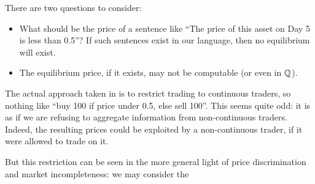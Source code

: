 \begin{definition}\label{def:exploitation}
    
\end{definition}






There are two questions to consider:

\begin{itemize}
    \item What should be the price of a sentence like ``The price of this asset on Day 5 is less than 0.5''? If such sentences exist in our language, then no equilibrium will exist.
    \item The equilibrium price, if it exists, may not be computable (or even in $\mathbb{Q}$).
\end{itemize}

The actual approach taken in \cite{logical_induction} is to restrict trading to continuous traders, so nothing like ``buy 100 if price under 0.5, else sell 100''. This seems quite odd: it is as if we are refusing to aggregate information from non-continuous traders. Indeed, the resulting prices could be exploited by a non-continuous trader, if it were allowed to trade on it.

But this restriction can be seen in the more general light of price discrimination and market incompleteness: we may consider the 
